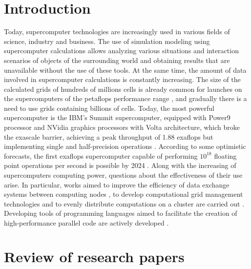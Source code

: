\documentclass[
11pt,%
tightenlines,%
twoside,%
onecolumn,%
nofloats,%
nobibnotes,%
nofootinbib,%
superscriptaddress,%
noshowpacs,%
centertags]%
{revtex4}
\begin{document}

\section{Introduction}

Today, supercomputer technologies are increasingly used in various fields of science, industry and business. 
The use of simulation modeling using supercomputer calculations allows analyzing various situations and interaction scenarios of objects of the surrounding world and obtaining results that are unavailable without the use of these tools. 
At the same time, the amount of data involved in supercomputer calculations is constantly increasing. 
The size of the calculated grids of hundreds of millions cells is already common for launches on the supercomputers of the petaflops performance range \cite{Rettinger,Krappel}, and gradually there is a need to use grids containing billions of cells. 
Today, the most powerful supercomputer is the IBM's Summit supercomputer, equipped with Power9 processor and NVidia graphics processors with Volta architecture, which broke the exascale barrier, achieving a peak throughput of 1.88 exaflops but implementing single and half-precision operations \cite{Hines}.
According to some optimistic forecasts, the first exaflops supercomputer capable of performing $ 10^{18} $ floating point operations per second is possible by 2024 \cite{Markidis}.
Along with the increasing of supercomputers computing power, questions about the effectiveness of their use arise. 
In particular, works aimed to improve the efficiency of data exchange systems between computing nodes \cite{Klenk,Abduljabbar}, to develop computational grid management technologies and to evenly distribute computations on a cluster are carried out \cite{Rybakov,Van,Benderskiy}. 
Developing tools of programming languages aimed to facilitate the creation of high-performance parallel code are actively developed \cite{Heller,Roganov}.

\section*{Review of research papers}
\end{document}
